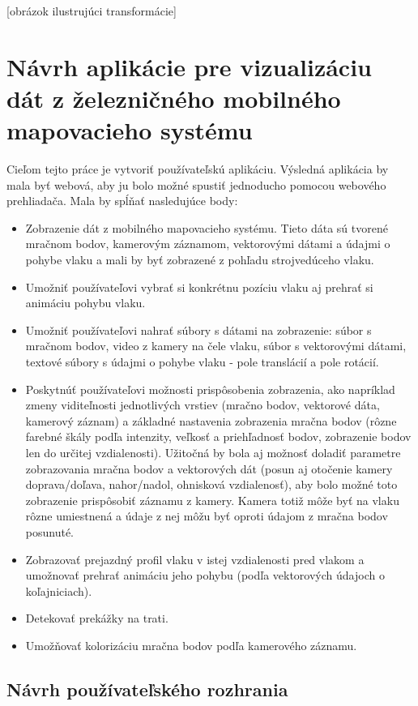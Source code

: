 [obrázok ilustrujúci transformácie]

\chapter{Návrh aplikácie pre vizualizáciu dát z železničného mobilného mapovacieho systému}

Cieľom tejto práce je vytvoriť používateľskú aplikáciu. Výsledná aplikácia by mala byť webová, aby ju bolo možné spustiť jednoducho pomocou webového prehliadača. Mala by spĺňať nasledujúce body:

\begin{itemize}
    \item Zobrazenie dát z mobilného mapovacieho systému. Tieto dáta sú tvorené mračnom bodov, kamerovým záznamom, vektorovými dátami a údajmi o pohybe vlaku a mali by byť zobrazené z pohľadu strojvedúceho vlaku.
    \item Umožniť používateľovi vybrať si konkrétnu pozíciu vlaku aj prehrať si animáciu pohybu vlaku.
    \item Umožniť používateľovi nahrať súbory s dátami na zobrazenie: súbor s mračnom bodov, video z kamery na čele vlaku, súbor s vektorovými dátami, textové súbory s údajmi o pohybe vlaku - pole translácií a pole rotácií.
    \item Poskytnúť používateľovi možnosti prispôsobenia zobrazenia, ako napríklad zmeny viditeľnosti jednotlivých vrstiev (mračno bodov, vektorové dáta, kamerový záznam) a základné nastavenia zobrazenia mračna bodov (rôzne farebné škály podľa intenzity, veľkosť a priehľadnosť bodov, zobrazenie bodov len do určitej vzdialenosti). Užitočná by bola aj možnosť doladiť parametre zobrazovania mračna bodov a vektorových dát (posun aj otočenie kamery doprava/doľava, nahor/nadol, ohnisková vzdialenosť), aby bolo možné toto zobrazenie prispôsobiť záznamu z kamery. Kamera totiž môže byť na vlaku rôzne umiestnená a údaje z nej môžu byť oproti údajom z mračna bodov posunuté.
    \item Zobrazovať prejazdný profil vlaku v istej vzdialenosti pred vlakom a umožnovať prehrať animáciu jeho pohybu (podľa vektorových údajoch o koľajniciach).
    \item Detekovať prekážky na trati.
    \item Umožňovať kolorizáciu mračna bodov podľa kamerového záznamu.
\end{itemize}

\section{Návrh používateľského rozhrania}

